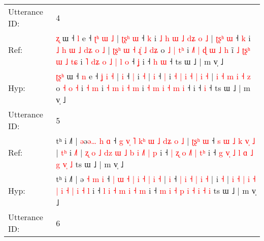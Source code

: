 \documentclass[10pt]{article}
\DeclareRobustCommand{\hl}[1]{{\textcolor{red}{#1}}}
\begin{document}
\begin{longtable}{ll}
 \\
\midrule
Utterance ID: & 4 \\
Ref: & \hl{}\hl{}\hl{ʐ} ɯ ˧ \hl{l} e ˧ \hl{ʈ}\hl{ʰ} \hl{ɯ} \hl{˩} |\hl{ }\hl{ʈ}\hl{ʂ}\hl{ʰ} \hl{ɯ} ˧ \hl{k} i\hl{ }\hl{˩}\hl{ }\hl{h}\hl{ }\hl{ɯ}\hl{ }\hl{˩}\hl{ }\hl{d}\hl{ʑ}\hl{ }\hl{o} \hl{˩} |\hl{ }\hl{ʈ}\hl{ʂ}\hl{ʰ} \hl{ɯ} ˧ \hl{k} i \hl{˩} \hl{h} \hl{ɯ} \hl{˩} \hl{d}\hl{ʑ} \hl{o} \hl{˩} | \hl{ʈ}\hl{ʂ}\hl{ʰ} \hl{ɯ} \hl{˧} \hl{ɻ}\hl{̍} \hl{˩} \hl{d}\hl{ʑ} o \hl{˩} \hl{|} \hl{t}\hl{ʰ} i\hl{ }\hl{˩}\hl{˥}\hl{ }\hl{|}\hl{ }\hl{ɖ}\hl{ }\hl{ɯ} \hl{˩} \hl{h} i\hl{̃} \hl{˩} \hl{ʈ}\hl{ʂ}\hl{ʰ} \hl{ɯ} \hl{˩} \hl{t}\hl{ɕ} i\hl{ }\hl{˥} \hl{d}\hl{ʑ} \hl{o} \hl{˩} \hl{|} \hl{l} \hl{o} ˧\hl{ }\hl{ʝ} i ˧\hl{ }\hl{h} \hl{ɯ} ˧ ts ɯ ˩ | m v̩ ˩
 \\
Hyp: & \hl{ʈ}\hl{ʂ}\hl{ʰ} ɯ ˧ \hl{n} e ˧ \hl{}\hl{ʝ} \hl{i} \hl{˧} |\hl{}\hl{}\hl{}\hl{} \hl{i} ˧ \hl{|} i\hl{}\hl{}\hl{}\hl{}\hl{}\hl{}\hl{}\hl{}\hl{}\hl{}\hl{}\hl{}\hl{} \hl{˧} |\hl{}\hl{}\hl{}\hl{} \hl{i} ˧ \hl{|} i \hl{˧} \hl{|} \hl{i} \hl{˧} \hl{}\hl{|} \hl{i} \hl{˧} | \hl{}\hl{}\hl{i} \hl{˧} \hl{m} \hl{}\hl{i} \hl{˧} \hl{}\hl{z} o \hl{˧} \hl{o} \hl{}\hl{˧} i\hl{}\hl{}\hl{}\hl{}\hl{}\hl{}\hl{}\hl{}\hl{} \hl{˧} \hl{m} i\hl{} \hl{˧} \hl{}\hl{}\hl{m} \hl{i} \hl{˧} \hl{}\hl{m} i\hl{}\hl{} \hl{}\hl{˧} \hl{m} \hl{i} \hl{˧} \hl{m} \hl{i} ˧\hl{}\hl{} i ˧\hl{}\hl{} \hl{i} ˧ ts ɯ ˩ | m v̩ ˩
 \\
\midrule
Utterance ID: & 5 \\
Ref: & tʰ i ˩˥ | \hl{ə}ə\hl{ə}\hl{…} \hl{h} \hl{ɑ} ˧ \hl{g} \hl{v}\hl{̩} \hl{˥} \hl{k}\hl{ʰ} \hl{ɯ} \hl{˩} \hl{d}\hl{ʑ} \hl{o} \hl{˩} |\hl{ }\hl{ʈ}\hl{ʂ}\hl{ʰ} \hl{ɯ} ˧ \hl{s} \hl{ɯ} \hl{˩} \hl{k} \hl{v}\hl{̩} \hl{˩} |\hl{ }\hl{t}\hl{ʰ} i \hl{˩}\hl{˥} | \hl{ʐ} \hl{o} \hl{˩} \hl{d}\hl{z} \hl{ɯ} \hl{˩} \hl{b} \hl{i} \hl{}\hl{˩}\hl{˥} \hl{|} \hl{p} i ˧ \hl{|} \hl{ʐ} \hl{o} \hl{˩}\hl{˥} \hl{|} \hl{}\hl{t}\hl{ʰ} i ˧ \hl{g} \hl{v}\hl{̩} \hl{˩} \hl{l} \hl{ɑ} \hl{˩} \hl{g} \hl{v}\hl{̩} \hl{˩} ts ɯ ˩ | m v̩ ˩
 \\
Hyp: & tʰ i ˩˥ | \hl{}ə\hl{ }\hl{˧} \hl{m} \hl{i} ˧ \hl{|} \hl{}\hl{ɯ} \hl{˧} \hl{}\hl{|} \hl{i} \hl{˧} \hl{}\hl{|} \hl{i} \hl{˧} |\hl{}\hl{}\hl{}\hl{} \hl{i} ˧ \hl{|} \hl{i} \hl{˧} \hl{|} \hl{}\hl{i} \hl{˧} |\hl{}\hl{}\hl{} i \hl{}\hl{˧} | \hl{i} \hl{˧} \hl{|} \hl{}\hl{i} \hl{˧} \hl{|} \hl{i} \hl{˧} \hl{|}\hl{ }\hl{i} \hl{˧} \hl{l} i ˧ \hl{l} \hl{i} \hl{˧} \hl{}\hl{m} \hl{i} \hl{˧}\hl{ }\hl{m} i ˧ \hl{m} \hl{}\hl{i} \hl{˧} \hl{p} \hl{i} \hl{˧} \hl{i} \hl{}\hl{˧} \hl{i} ts ɯ ˩ | m v̩ ˩
 \\
\midrule
Utterance ID: & 6 \\

\end{longtable}
\end{document}
